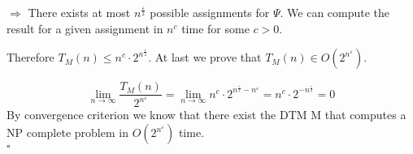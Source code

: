 $\Rightarrow$ There exists at most $n^\frac{\varepsilon}{2}$ possible assignments for $\Psi$. We can
compute the result for a given assignment in $n^c$ time for some $c > 0$.

Therefore $T_M (n) \leq n^c \cdot 2^{n^\frac{\varepsilon}{2}}$. At last we prove that $T_M(n) \in O(2^{n^\varepsilon})$.

$$
\lim_{n\rightarrow \infty} \frac{T_M (n)}{2^{n^\varepsilon}} = \lim_{n \rightarrow \infty} n^c \cdot 2^{n^\frac{\varepsilon}{2} - n^\varepsilon}
= n^c \cdot 2^{-n^\frac{\varepsilon}{2}} = 0
$$
By convergence criterion we know that there exist the DTM M that computes a NP complete problem in $O(2^{n^\varepsilon})$ time.\\
\mbox{} \hfill $\square$